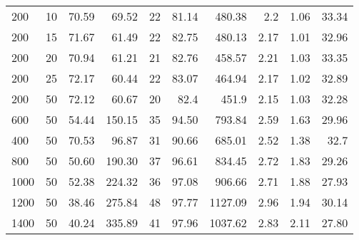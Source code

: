 \begin{table}[H]
{{\begin{tabular}{lrrrrrrrrr}
                \hline
                200        & 10                   & 70.59             & 69.52           & 22       & 81.14          & 480.38                     & 2.2       & 1.06              & 33.34                    \\
                200        & 15                   & 71.67             & 61.49           & 22       & 82.75          & 480.13                     & 2.17      & 1.01              & 32.96                    \\
                200        & 20                   & 70.94             & 61.21           & 21       & 82.76          & 458.57                     & 2.21      & 1.03              & 33.35                    \\
                200        & 25                   & 72.17             & 60.44           & 22       & 83.07          & 464.94                     & 2.17      & 1.02              & 32.89                    \\
                \hline
                200        & 50                   & 72.12             & 60.67           & 20       & 82.4           & 451.9                      & 2.15      & 1.03              & 32.28                    \\
                600        & 50                   & 54.44             & 150.15          & 35       & 94.50          & 793.84                     & 2.59      & 1.63              & 29.96                    \\
                400        & 50                   & 70.53             & 96.87           & 31       & 90.66          & 685.01                     & 2.52      & 1.38              & 32.7                     \\
                800        & 50                   & 50.60             & 190.30          & 37       & 96.61          & 834.45                     & 2.72      & 1.83              & 29.26                    \\
                1000       & 50                   & 52.38             & 224.32          & 36       & 97.08          & 906.66                     & 2.71      & 1.88              & 27.93                    \\
                1200       & 50                   & 38.46             & 275.84          & 48       & 97.77          & 1127.09                    & 2.96      & 1.94              & 30.14                    \\
                1400       & 50                   & 40.24             & 335.89          & 41       & 97.96          & 1037.62                    & 2.83      & 2.11              & 27.80                    \\

\end{tabular}}}
\end{table}
